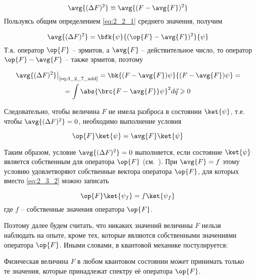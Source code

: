 \begin{equation}
\label{eq:3_2_10}
\avg{(\Delta F)^2} \equiv \avg{(F - \avg{F})^2}
\end{equation}%
%
Пользуясь общим определением \eqref{eq:2_2_1} среднего значения, получим

\begin{equation}
\label{eq:3_2_11}
\avg{(\Delta F)^2} = \bfk{\psi}{(\op{F} - \avg{F})^2}{\psi}
\end{equation}%
%
Т.к. оператор $\op{F}$ -- эрмитов, а $\avg{F}$ -- действительное число, то оператор $\op{F} - \avg{F}$ -- также эрмитов, поэтому

\begin{equation}
\label{eq:3_2_12}
\begin{gathered}
\left. \avg{(\Delta F)^2} \right|_{\text{\eqref{eq:3_2_7_add}}} =
  \bk{(F - \avg{F})\psi}{(F - \avg{F})\psi} = \\ =
  \int \abs{\brc{F - \avg{F}}\psi}^2 d\vec{q} \geqslant 0
\end{gathered}
\end{equation}

Следовательно, чтобы величина $F$ не имела разброса в состоянии $\ket{\psi}$, т.е. чтобы $\avg{(\Delta F)^2} = 0$, необходимо выполнение условия

\begin{equation}
\label{eq:3_2_13}
\op{F}\ket{\psi} = \avg{F}\ket{\psi}
\end{equation}

Таким образом, условие $\avg{(\Delta F)^2} = 0$ выполняется, если состояние $\ket{\psi}$ является собственным для оператора $\op{F}$ (см.~). При $\avg{F} = f$ этому условию удовлетворяют собственные вектора оператора $\op{F}$, для которых вместо \eqref{eq:2_3_2} можно записать

\begin{equation}
\label{eq:3_2_14}
\op{F}\ket{\psi_{f}} = f \ket{\psi_{f}}
\end{equation}%
%
где $f$ -- собственные значения оператора $\op{F}$.

Поэтому далее будем считать, что никаких значений величины $F$ нельзя наблюдать на опыте, кроме тех, которые являются собственными значениями оператора $\op{F}$. Иными словами, в квантовой механике постулируется:
\begin{stmt}
Физическая величина $F$ в любом квантовом состоянии может принимать только те значения, которые принадлежат спектру её оператора $\op{F}$.
\end{stmt}

